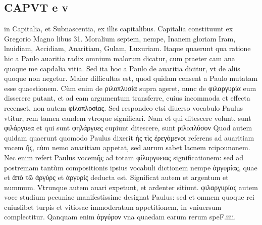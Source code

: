 \documentclass{article}
\begin{document}
\begin{pages}
\section*{CAPVT e v }
\marginpar{[ p.455 ]}\pstart in Capitalia, et Subnascentia, ex illis capitalibus.  \pend\pstart Capitalia constituunt ex Gregorio Magno libus 31. Moralium septem, nempe, Inanem gloriam Iram, lnuidiam, Accidiam, Auaritiam, Gulam, Luxuriam. Itaque quaerunt qua ratione hic a Paulo auaritia radix omnium malorum dicatur, cum praeter cam ana quoque me capdalia vitia. Sed ita hoc a Paulo de auaritia dicitur, vt de aliis quoque non negetur.  \pend\pstart Maior difficultas est, quod quidam censent a Paulo mutatam esse quaestionem. Cùm enim de ριλοπλυσία supra ageret, nunc de φιλαργυρία eum disserere putant, et ad eam argumentum transferre, cuius incommoda et effecta recenset, non autem φίλοπλοσίας. Sed respondeo etsi diuerso vocabulo Paulus vtitur, rem tamen eandem vtroque  significari. Nam et qui ditescere volunt, sunt φιλάργυεα et qui sunt φηλάργυες cupiunt ditescere, sunt ρiλoπλύσον Quod autem quidam quaerunt quomodo Paulus dixerit ἡς τὶς ἐρεγόμενοι referens ad auaritiam vocem ῆς, cùm nemo auaritiam appetat, sed aurum sabet lacnem rcipounonem. Nec enim refert Paulus vocemῆς ad totam φἰλαργυειας significationem: sed ad postremam tantùm compositionis ipsius vocabuli dictionem nempe ἀργυρίας, quae et ἀπὸ τῶ ἀργύρς et ἀργυρίς deducta est. Significat autem et argentum et nummum. Vtrunque autem auari expetunt, et ardenter sitiunt.  \pend\pstart φιλαργυρίας autem voce studium pecuniae manifestissime designat Paulus: sed et omnem quoque rei cuiuslibet turpis et vitiosae immoderatam appetitionem, in vniuersum complectitur. Qanquam enim ἀργύρον vna quaedam earum rerum speF.iiii.  \pend

\end{pages}
\end{document}

